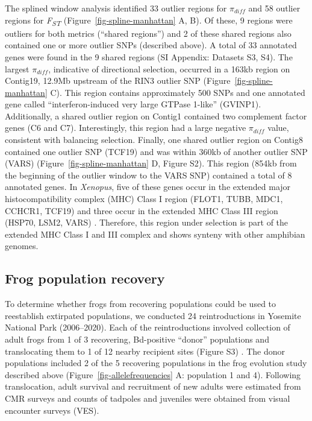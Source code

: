 \documentclass[9pt,twocolumn,twoside,lineno]{pnas-new}
\begin{document}
The splined window analysis identified 33 outlier regions for
\(\pi_{diff}\) and 58 outlier regions for \emph{F\textsubscript{ST}}
(Figure~\ref{fig-spline-manhattan} A, B). Of these, 9 regions were
outliers for both metrics (``shared regions'') and 2 of these shared
regions also contained one or more outlier SNPs (described above). A
total of 33 annotated genes were found in the 9 shared regions (SI
Appendix: Datasets S3, S4). The largest \(\pi_{diff}\), indicative of
directional selection, occurred in a 163kb region on Contig19, 12.9Mb
upstream of the RIN3 outlier SNP (Figure~\ref{fig-spline-manhattan} C).
This region contains approximately 500 SNPs and one annotated gene
called ``interferon-induced very large GTPase 1-like'' (GVINP1).
Additionally, a shared outlier region on Contig1 contained two
complement factor genes (C6 and C7). Interestingly, this region had a
large negative \(\pi_{diff}\) value, consistent with balancing
selection. Finally, one shared outlier region on Contig8 contained one
outlier SNP (TCF19) and was within 360kb of another outlier SNP (VARS)
(Figure~\ref{fig-spline-manhattan} D, Figure S2).
This region (854kb from the beginning of the outlier window to the VARS
SNP) contained a total of 8 annotated genes. In \emph{Xenopus}, five of
these genes occur in the extended major histocompatibility complex (MHC)
Class I region (FLOT1, TUBB, MDC1, CCHCR1, TCF19) and three occur in the
extended MHC Class III region (HSP70, LSM2, VARS) \citep{ohta2006}.
Therefore, this region under selection is part of the extended MHC Class
I and III complex and shows synteny with other amphibian genomes.

\subsection*{Frog population recovery}

To determine whether frogs from recovering populations could be used to
reestablish extirpated populations, we conducted 24 reintroductions in
Yosemite National Park (2006--2020). Each of the reintroductions
involved collection of adult frogs from 1 of 3 recovering, Bd-positive
``donor'' populations and translocating them to 1 of 12 nearby recipient
sites (Figure S3) \citep{seddon2014}. The donor
populations included 2 of the 5 recovering populations in the frog
evolution study described above (Figure~\ref{fig-allelefrequencies} A:
population 1 and 4). Following translocation, adult survival and
recruitment of new adults were estimated from CMR surveys and counts of
tadpoles and juveniles were obtained from visual encounter surveys
(VES).
\end{document}

